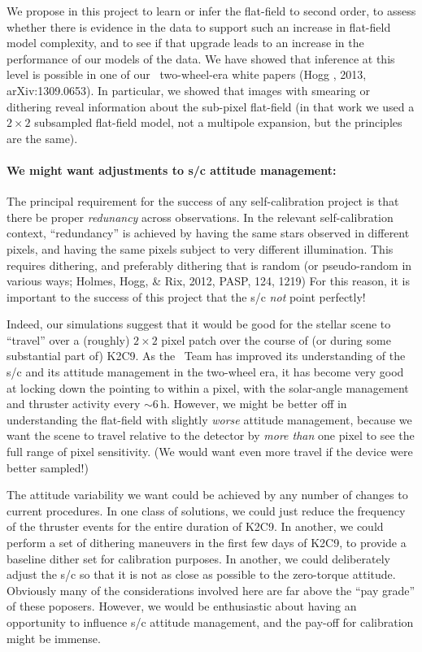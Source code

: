 \documentclass[12pt,preprint]{aastex}
\begin{document}
We propose in this project to learn or infer the flat-field to second
order, to assess whether there is evidence in the data to support such
an increase in flat-field model complexity, and to see if that upgrade
leads to an increase in the performance of our models of the data.
We have showed that inference at this level is possible in one of our
\kepler\ two-wheel-era white papers (Hogg \etal, 2013, arXiv:1309.0653).
In particular, we showed that images with smearing or dithering reveal
information about the sub-pixel flat-field (in that work we used a
$2\times 2$ subsampled flat-field model, not a multipole expansion,
but the principles are the same).

\paragraph{We might want adjustments to s/c attitude management:}

The principal requirement for the success of any self-calibration project
is that there be proper \emph{redunancy} across observations.
In the relevant self-calibration context, ``redundancy'' is achieved
by having the same stars observed in different pixels, and having the
same pixels subject to very different illumination.
This requires dithering, and preferably dithering that is random (or
pseudo-random in various ways; Holmes, Hogg, \& Rix, 2012, PASP, 124,
1219)
For this reason, it is important to the success of this project that
the s/c \emph{not} point perfectly!

Indeed, our simulations suggest that it would be good for the stellar
scene to ``travel'' over a (roughly) $2\times2$ pixel patch over the
course of (or during some substantial part of) K2C9.
As the \ktwo\ Team has improved its understanding of the s/c and its
attitude management in the two-wheel era, it has become very good at
locking down the pointing to within a pixel, with the solar-angle
management and thruster activity every $\sim 6$\,h.
However, we might be better off in understanding the flat-field with
slightly \emph{worse} attitude management, because we want the scene
to travel relative to the detector by \emph{more than} one pixel to
see the full range of pixel sensitivity.
(We would want even more travel if the device were better sampled!)

The attitude variability we want could be achieved by any number of
changes to current procedures.
In one class of solutions, we could just reduce the frequency of the
thruster events for the entire duration of K2C9.
In another, we could perform a set of dithering maneuvers in the first
few days of K2C9, to provide a baseline dither set for calibration
purposes.
In another, we could deliberately adjust the s/c so that it is not as
close as possible to the zero-torque attitude.
Obviously many of the considerations involved here are far above the 
``pay grade'' of these poposers.
However, we would be enthusiastic about having an opportunity to influence
s/c attitude management, and the pay-off for calibration might be immense.
\end{document}
